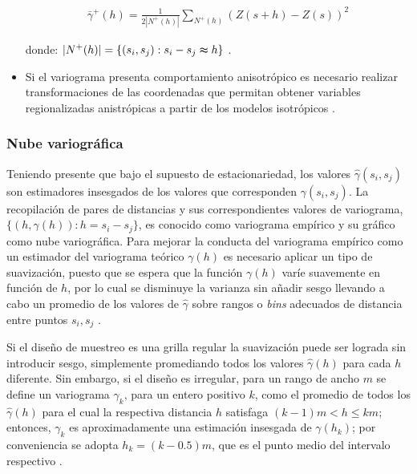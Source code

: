 \documentclass[
]{book}
\begin{document}
\begin{itemize}
  \begin{align*}
      \bar{\gamma}^+(h)=\frac{1}{2|N^+(h)|}\sum_{N^+(h)}(Z(s+h)-Z(s))^2  
    \end{align*}

  donde: \(|N^+(h)|=\{(s_i,s_j): s_i-s_j \thickapprox h\}\) \citep{montero}.
\item
  Si el variograma presenta comportamiento anisotrópico es necesario realizar transformaciones de las coordenadas que permitan obtener variables regionalizadas anistrópicas a partir de los modelos isotrópicos \citep{hans}.
\end{itemize}

\hypertarget{nube-variogruxe1fica}{%
\subsubsection*{Nube variográfica}\label{nube-variogruxe1fica}}

Teniendo presente que bajo el supuesto de estacionariedad, los valores \(\hat{\gamma}(s_i,s_j)\) son estimadores insesgados de los valores que corresponden \(\gamma(s_i,s_j)\). La recopilación de pares de distancias y sus correspondientes valores de variograma, \(\{(h,\gamma(h)): h=s_i-s_j\}\), es conocido como variograma empírico y su gráfico como nube variográfica. Para mejorar la conducta del variograma empírico como un estimador del variograma teórico \(\gamma(h)\) es necesario aplicar un tipo de suavización, puesto que se espera que la función \(\gamma(h)\) varíe suavemente en función de \(h\), por lo cual se disminuye la varianza sin añadir sesgo llevando a cabo un promedio de los valores de \(\hat{\gamma}\) sobre rangos o \textit{bins} adecuados de distancia entre puntos \(s_i,s_j\) \citep{peter}.

Si el diseño de muestreo es una grilla regular la suavización puede ser lograda sin introducir sesgo, simplemente promediando todos los valores \(\hat{\gamma}(h)\) para cada \(h\) diferente. Sin embargo, si el diseño es irregular, para un rango de ancho \(m\) se define un variograma \(\gamma_k\), para un entero positivo \(k\), como el promedio de todos los \(\hat{\gamma}(h)\) para el cual la respectiva distancia \(h\) satisfaga \((k-1)m<h\leq km\); entonces, \(\gamma_k\) es aproximadamente una estimación insesgada de \(\gamma(h_k)\); por conveniencia se adopta \(h_k=(k-0.5)m\), que es el punto medio del intervalo respectivo \citep{peter}.
\end{document}

